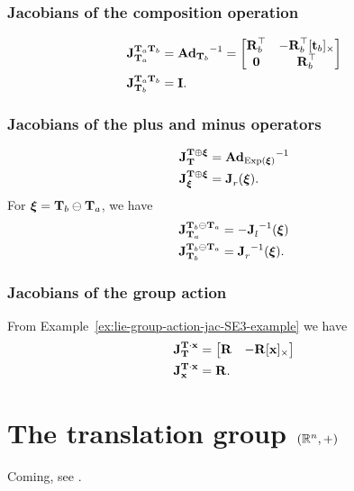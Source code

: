 \subsubsection*{Jacobians of the composition operation}
\begin{align}
  \jac{\matT_a \matT_b}{\matT_a} &= {\mAd_{\matT_b}}^{-1} = 
  \begin{bmatrix}
    \matR_b\trans & -\matR_b\trans \skewsymm{\vect_b}\\
    \matr{0} & \matR_b\trans
  \end{bmatrix}\\
  \jac{\matT_a \matT_b}{\matT_b} &= \matI.
\end{align}

\subsubsection*{Jacobians of the plus and minus operators}
\begin{align}
  \jac{\matT \oplus \vecxi}{\matT} &= {\mAd_{\Exp(\vecxi)}}^{-1}\\
  \jac{\matT \oplus \vecxi}{\vecxi} &= \jac{}{r}(\vecxi).
\end{align}
For $\vecxi = \matT_b \ominus \matT_a$, we have
\begin{align}
  \jac{\matT_b \ominus \matT_a}{\matT_a} &= -\jac{}{l}^{-1}(\vecxi)  \label{eq:jacobian-minus-x-SE3}\\
  \jac{\matT_b \ominus \matT_a}{\matT_b} &= \jac{}{r}^{-1}(\vecxi).
\end{align}

\subsubsection*{Jacobians of the group action}
From Example~\ref{ex:lie-group-action-jac-SE3-example} we have
\begin{align}
  \jac{\matT \cdot \vecx}{\matT} &= 
  \begin{bmatrix}
    \matR & -\matR\skewsymm{\vecx}
  \end{bmatrix}\\
  \jac{\matT \cdot \vecx}{\vecx} &= \matR.
\end{align}

\section{The translation group \texorpdfstring{$(\bbR^n, +)$}{}} \label{sec:translation_group}
Coming, see \cite{SolaARobotics}.
